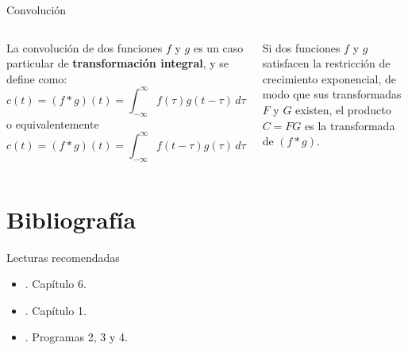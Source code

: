 \documentclass[9pt, aspectratio=169]{beamer}
\begin{document}
\begin{frame}{Convolución}
	\begin{columns}[t]
		\cx
		La convolución de dos funciones $f$ y $g$ es un caso particular de \textbf{transformación integral}, y se define como:
		\[ c(t) = (f * g)(t) = \int_{-\infty}^{\infty} f(\tau) g(t - \tau) \, d\tau \]
		o equivalentemente
		\[ c(t) = (f * g)(t) = \int_{-\infty}^{\infty} f(t - \tau) g(\tau) \, d\tau \]

		\cx
		\begin{theorem}[Convolución]
			Si dos funciones $f$ y $g$ satisfacen la restricción de crecimiento exponencial, de modo que sus transformadas $F$ y $G$ existen, el producto $C = FG$ es la transformada de $(f * g)$.
		\end{theorem}
	\end{columns}
\end{frame}

\section*{Bibliografía}
\begin{frame}{Lecturas recomendadas}
	\begin{itemize}
		\item {}. Capítulo 6.
		\item {}. Capítulo 1.
		\item {}. Programas 2, 3 y 4.
	\end{itemize}
\end{frame}
\end{document}
